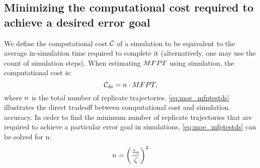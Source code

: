 \subsection{Minimizing the computational cost required to achieve a desired error goal}
We define the computational cost $\mathcal{C}$ of a simulation to be equivalent to the average in-simulation time required to complete it (alternatively, one may use the count of simulation steps). When estimating $MFPT$ using  simulation, the computational cost is:
    \begin{equation}\label{eq:cost_mfptestds}
        {\mathcal{C}}_{\textrm{ds}} = n \cdot MFPT,
    \end{equation}
where $n$ is the total number of replicate trajectories. \eqref{eq:moe_mfptestds} illustrates the direct tradeoff between computational cost and simulation accuracy. In order to find the minimum number of replicate trajectories that are required to achieve a particular error goal in  simulations, \eqref{eq:moe_mfptestds} can be solved for n:
    \begin{equation}\label{eq:ds_optimizing}
        n = {\left( \frac{z_{\alpha}}{\zeta} \right)}^{2}
    \end{equation}

